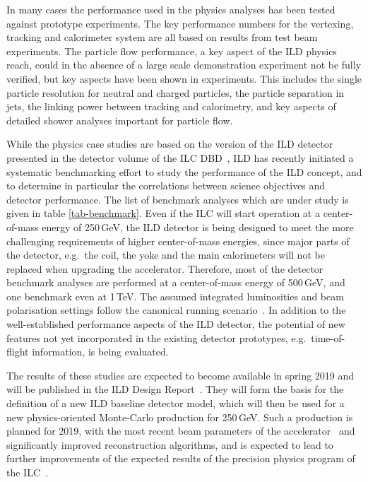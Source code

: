 \documentclass[%
 amsmath,amssymb,
 aps,
 longbibliography,
]{revtex4-1}
\begin{document}
In many cases the performance used in the physics analyses has been tested against prototype experiments. The key performance numbers for the vertexing, tracking and calorimeter system are all based on results from test beam experiments. The particle flow performance, a key aspect of the ILD physics reach, could in the absence of a large scale demonstration experiment not be fully verified, but key aspects have been shown in experiments. This includes the single particle resolution for neutral and charged particles, the particle separation in jets, the linking power between tracking and calorimetry, and key aspects of detailed shower analyses important for particle flow. 

While the physics case studies are based on the version of the ILD detector presented in the detector volume of the ILC DBD~\cite{Behnke:2013lya}, ILD has recently initiated a systematic benchmarking effort to study the performance of the ILD concept, and to determine in particular the correlations between science objectives and detector performance. The list of benchmark analyses which are under study is given in table \ref{tab-benchmark}. Even if the ILC will start operation at a center-of-mass energy of 250\,GeV, the ILD detector is being designed to meet the more challenging requirements of higher center-of-mass energies, since major parts of the detector, e.g.\ the coil, the yoke and the main calorimeters will not be replaced when upgrading the accelerator. Therefore, most of the detector benchmark analyses are performed at a center-of-mass energy of 500\,GeV, and one benchmark even at 1\,TeV. The assumed integrated luminosities and beam polarisation settings follow the canonical running scenario~\cite{Barklow:2015tja}. 
In addition to the well-established performance aspects of the ILD detector, the potential of new features not yet incorporated in the existing detector prototypes, e.g.\ time-of-flight information, is being evaluated. 

The results of these studies are expected to become available in spring 2019 and will be published in the ILD Design Report~\cite{fwdrefIDR}. They will form the basis for the definition of a new ILD baseline detector model, which will then be used for a new physics-oriented Monte-Carlo production for 250\,GeV. Such a production is planned for 2019, with the most recent beam parameters of the accelerator~\cite{Evans:2017rvt} and significantly improved reconstruction algorithms, and is expected to lead to further improvements of the expected results of the precision physics program of the ILC~\cite{ILCESU1}.
\end{document}
